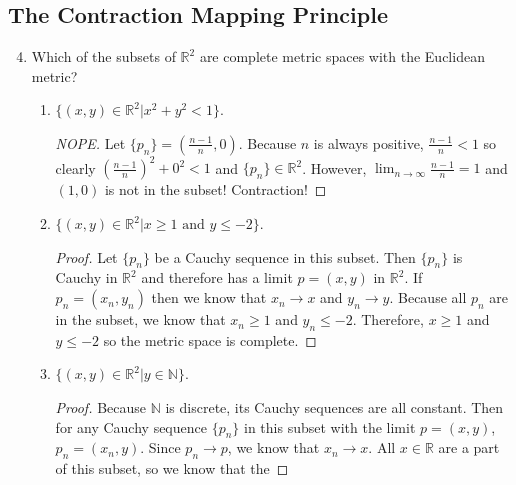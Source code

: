 \documentclass{article}
\begin{document}
\subsection{The Contraction Mapping Principle}
\begin{enumerate}
      \setcounter{enumi}{3}
      \item Which of the subsets of $\mathbb{R}^2$ are complete metric spaces
            with the Euclidean metric?
            \begin{enumerate}
                  \item $\{(x, y)\in\mathbb{R}^2|x^2+y^2<1 \}$.
                        \begin{proof}[NOPE]
                              Let $\{p_n\} = (\frac{n-1}{n}, 0)$. Because
                              $n$ is always positive, $\frac{n-1}{n}<1$ so clearly
                              $(\frac{n-1}{n})^2+0^2<1$ and $\{p_n\}\in\mathbb{R}^2$.
                              However, $\lim_{n\to\infty}\frac{n-1}{n}=1$ and
                              $(1,0)$ is not in the subset! Contraction!
                        \end{proof}
                  \item $\{(x, y)\in\mathbb{R}^2|x\geq 1\text{ and }y\leq -2\}$.
                        \begin{proof}
                              Let $\{p_n\}$ be a Cauchy sequence in this subset.
                              Then $\{p_n\}$ is Cauchy in $\mathbb{R}^2$ and
                              therefore has a limit $p=(x,y)$ in $\mathbb{R}^2$.
                              If $p_n=(x_n, y_n)$ then we know that $x_n\to x$
                              and $y_n\to y$. Because all $p_n$ are in the subset,
                              we know that $x_n\geq 1$ and $y_n\leq -2$. Therefore,
                              $x\geq 1$ and $y\leq -2$ so the metric space is complete.
                        \end{proof}
                  \item $\{(x, y)\in\mathbb{R}^2|y\in\mathbb{N} \}$.
                        \begin{proof}
                              Because $\mathbb{N}$ is discrete, its Cauchy
                              sequences are all constant. Then for any Cauchy
                              sequence $\{p_n\}$ in this subset with the limit
                              $p=(x,y)$, $p_n=(x_n,y)$. Since $p_n\to p$,
                              we know that $x_n\to x$. All $x\in\mathbb{R}$
                              are a part of this subset, so we know that the

\end{proof}
\end{enumerate}
\end{enumerate}
\end{document}
